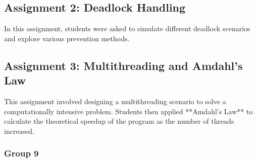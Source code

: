 \documentclass[12pt]{article}
\begin{document}
\subsection{Assignment 2: Deadlock Handling}
In this assignment, students were asked to simulate different deadlock scenarios and explore various prevention methods.

\subsection{Assignment 3: Multithreading and Amdahl's Law}
This assignment involved designing a multithreading scenario to solve a computationally intensive problem. Students then applied **Amdahl's Law** to calculate the theoretical speedup of the program as the number of threads increased.

\subsubsection{Group 9}
\end{document}
